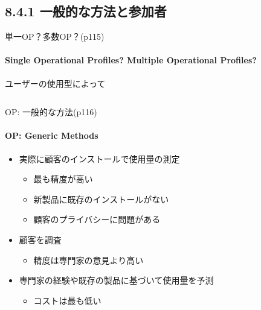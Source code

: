 \subsection{8.4.1 一般的な方法と参加者}
\begin{frame}{単一OP？多数OP？(p115)}
\framesubtitle{Single Operational Profiles? Multiple Operational Profiles?}
ユーザーの使用型によって
\begin{columns}
\begin{column}{0.5\textwidth}
\begin{center}
\end{center}
\end{column}
\begin{column}{0.5\textwidth}
\begin{center}
\end{center}
\end{column}
\end{columns}
\end{frame}
\begin{frame}{OP: 一般的な方法(p116)}
\framesubtitle{OP: Generic Methods}
\begin{itemize}
\item 実際に顧客のインストールで使用量の測定
    \begin{itemize}
    \item 最も精度が高い
    \item 新製品に既存のインストールがない
    \item 顧客のプライバシーに問題がある
    \end{itemize}
\item 顧客を調査
    \begin{itemize}
    \item 精度は専門家の意見より高い
    \end{itemize}
\item 専門家の経験や既存の製品に基づいて使用量を予測
    \begin{itemize}
    \item コストは最も低い
    \end{itemize}
\end{itemize}
\end{frame}
